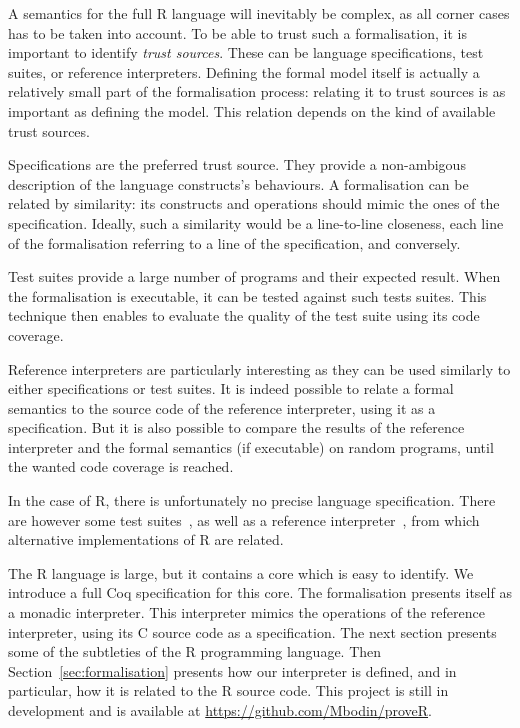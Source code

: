 \documentclass[9pt, sigplan, natbib=false, screen=true]{acmart}
\newcommand\Coq{Coq}
\newcommand\R{R}
\newcommand\Cn{C}
\begin{document}
A semantics for the full \R{} language will inevitably
be complex, as all corner cases has to be taken into account.
%
To be able to trust such a formalisation,
it is important to identify \emph{trust sources}.
These can be language specifications,
test suites,
or reference interpreters.
%
Defining the formal model itself
is actually a relatively small part of the formalisation process:
relating it to trust sources
is as important as defining the model.
This relation depends on the kind of available trust sources.

Specifications are the preferred trust source.
They provide a non-ambigous description of the language constructs's behaviours.
A formalisation can be related by similarity:
its constructs and operations should mimic the ones
of the specification.
Ideally, such a similarity would be a line-to-line closeness,
each line of the formalisation referring to a line of the specification,
and conversely.

Test suites provide a large number of programs and their expected result.
When the formalisation is executable, it can be tested against such tests suites.
This technique then enables to evaluate the quality of the test suite
using its code coverage.

Reference interpreters are particularly interesting as
they can be used similarly to either specifications or test suites.
It is indeed possible to relate a formal semantics
to the source code of the reference interpreter,
using it as a specification.
But it is also possible to compare the results of the reference interpreter
and the formal semantics (if executable) on random programs,
until the wanted code coverage is reached.

In the case of \R{}, there is unfortunately
no precise language specification.
There are however some test suites~\parencite{2014testr, maj2013testr},
as well as a reference interpreter~\parencite{team2000r},
from which alternative implementations of \R{} are related.

The \R{} language is large,
but it contains a core which is easy to identify.
We introduce a full \Coq{} specification for this core.
The formalisation presents itself as a monadic interpreter.
This interpreter mimics the operations of the reference interpreter,
using its \Cn{} source code as a specification.
%
The next section presents some of the subtleties of the \R{} programming language.
Then Section~\ref{sec:formalisation} presents how our interpreter is defined,
and in particular, how it is related to the \R{} source code.
This project is still in development
and is available at \url{https://github.com/Mbodin/proveR}.
\end{document}
